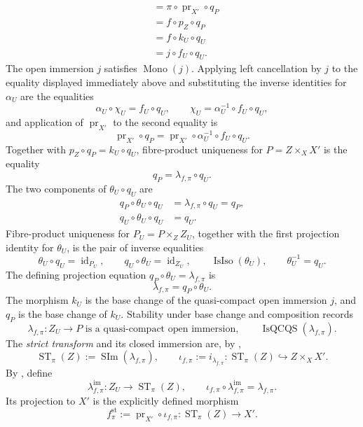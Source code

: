 \begin{definition}
\[\begin{aligned}
      &=\pi\circ\operatorname{pr}_{X'}\circ q_P\\
      &=f\circ p_Z\circ q_P\\
      &=f\circ k_U\circ q_U\\
      &=j\circ f_U\circ q_U.
  \end{aligned}
  \]
  The open immersion $j$ satisfies
  $\operatorname{Mono}(j)$.  Applying left cancellation by $j$ to
  the equality displayed immediately above and substituting the inverse
  identities for $\alpha_U$ are the equalities
  \[
    \alpha_U\circ\chi_U=f_U\circ q_U,
    \qquad
    \chi_U=\alpha_U^{-1}\circ f_U\circ q_U,
  \]
  and application of $\operatorname{pr}_{X'}$ to the second equality is
  \[
    \operatorname{pr}_{X'}\circ q_P
      =\operatorname{pr}_{X'}\circ\alpha_U^{-1}\circ f_U\circ q_U.
  \]
  Together with $p_Z\circ q_P=k_U\circ q_U$, fibre-product uniqueness for
  $P=Z\times_XX'$ is the equality
  \[
    q_P=\lambda_{f,\pi}\circ q_U.
  \]
  The two components of $\theta_U\circ q_U$ are
  \[
  \begin{aligned}
    q_P\circ\theta_U\circ q_U
      &=\lambda_{f,\pi}\circ q_U=q_P,\\
    q_U\circ\theta_U\circ q_U&=q_U.
  \end{aligned}
  \]
  Fibre-product uniqueness for $P_U=P\times_ZZ_U$, together with the first
  projection identity for $\theta_U$, is the pair of inverse equalities
  \[
    \theta_U\circ q_U=\operatorname{id}_{P_U},
    \qquad
    q_U\circ\theta_U=\operatorname{id}_{Z_U},
    \qquad
    \operatorname{IsIso}(\theta_U),
    \qquad
    \theta_U^{-1}=q_U.
  \]
  The defining projection equation $q_P\circ\theta_U=\lambda_{f,\pi}$ is
  \[
    \lambda_{f,\pi}=q_P\circ\theta_U.
  \]
  The morphism $k_U$ is the base change of the quasi-compact open immersion
  $j$, and $q_P$ is the base change of $k_U$.  Stability under base change
  and composition records
  \[
    \lambda_{f,\pi}\colon Z_U\to P
      \text{ is a quasi-compact open immersion},
    \qquad
    \operatorname{IsQCQS}(\lambda_{f,\pi}).
  \]
  The \emph{strict transform} and its closed immersion are, by
  ,
  \[
    \operatorname{ST}_{\pi}(Z)
      :=\operatorname{SIm}(\lambda_{f,\pi}),
    \qquad
    \iota_{f,\pi}:=i_{\lambda_{f,\pi}}\colon
      \operatorname{ST}_{\pi}(Z)\hookrightarrow Z\times_XX'.
  \]
  By , define
  \[
    \lambda_{f,\pi}^{\mathrm{im}}\colon
      Z_U\longrightarrow\operatorname{ST}_{\pi}(Z),
    \qquad
    \iota_{f,\pi}\circ\lambda_{f,\pi}^{\mathrm{im}}
      =\lambda_{f,\pi}.                                           \tag{ST0f}
  \]
  Its projection to $X'$ is the explicitly defined morphism
  \[
    f^{\mathrm{st}}_{\pi}
      :=\operatorname{pr}_{X'}\circ\iota_{f,\pi}
      \colon\operatorname{ST}_{\pi}(Z)\longrightarrow X'.
  \]


\end{definition}
